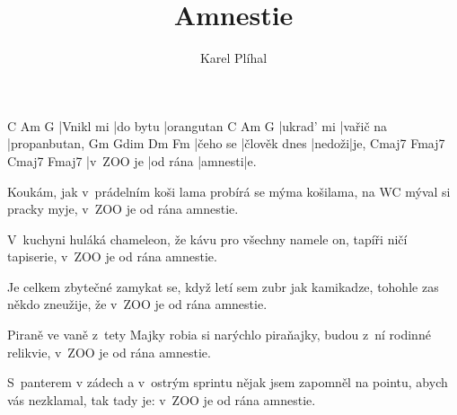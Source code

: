\documentclass{song}
\title{Amnestie}
\author{Karel Plíhal}
\begin{document}
\strophe
C         Am       G
|Vnikl mi |do bytu |orangutan
C          Am        G
|ukrad' mi |vařič na |propanbutan,
Gm       Gdim         Dm     Fm
|čeho se |člověk dnes |nedoži|je,
Cmaj7     Fmaj7    Cmaj7   Fmaj7
|v~ZOO je |od rána |amnesti|e.
\endstrophe

\strophe*
Koukám, jak v~prádelním koši lama
probírá se mýma košilama,
na WC mýval si pracky myje,
v~ZOO je od rána amnestie.
\endstrophe

\strophe*
V~kuchyni huláká chameleon,
že kávu pro všechny namele on,
tapíři ničí tapiserie,
v~ZOO je od rána amnestie.
\endstrophe

\strophe*
Je celkem zbytečné zamykat se,
když letí sem zubr jak kamikadze,
tohohle zas někdo zneužije,
že v~ZOO je od rána amnestie.
\endstrophe

\strophe*
Piraně ve vaně z~tety Majky
robia si narýchlo piraňajky,
budou z~ní rodinné relikvie,
v~ZOO je od rána amnestie.
\endstrophe

\strophe*
S~panterem v zádech a v~ostrým sprintu
nějak jsem zapomněl na pointu,
abych vás nezklamal, tak tady je:
v~ZOO je od rána amnestie.
\endstrophe
\end{document}
